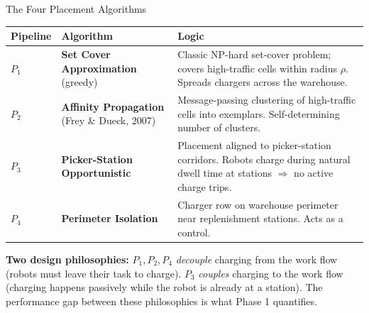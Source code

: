 \documentclass[aspectratio=169,10pt]{beamer}
\begin{document}
\begin{frame}{The Four Placement Algorithms}
  \footnotesize
  \begin{tabular}{p{}p{}p{}}
    \toprule
    Pipeline & Algorithm & Logic \\
    \midrule
    $P_1$ & \textbf{Set Cover Approximation} (greedy) & Classic NP-hard set-cover problem; covers high-traffic cells within radius $\rho$. Spreads chargers across the warehouse. \\
    \addlinespace
    $P_2$ & \textbf{Affinity Propagation} (Frey \& Dueck, 2007) & Message-passing clustering of high-traffic cells into exemplars. Self-determining number of clusters. \\
    \addlinespace
    $P_3$ & \textbf{Picker-Station Opportunistic} & Placement aligned to picker-station corridors. Robots charge during natural dwell time at stations $\Rightarrow$ no active charge trips. \\
    \addlinespace
    $P_4$ & \textbf{Perimeter Isolation} & Charger row on warehouse perimeter near replenishment stations. Acts as a control. \\
    \bottomrule
  \end{tabular}

  \vspace{0.5em}
  \textbf{Two design philosophies:} $P_1, P_2, P_4$ \emph{decouple} charging from the work flow (robots must leave their task to charge). $P_3$ \emph{couples} charging to the work flow (charging happens passively while the robot is already at a station). The performance gap between these philosophies is what Phase 1 quantifies.
\end{frame}
\end{document}
